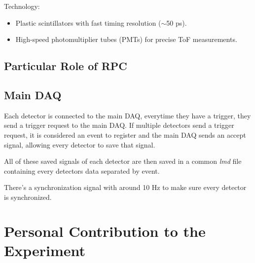 Technology:

\begin{itemize}
	\item Plastic scintillators with fast timing resolution ($\sim$50 ps).
	\item High-speed photomultiplier tubes (PMTs) for precise ToF measurements.
\end{itemize}



\subsection{Particular Role of RPC}

\cite{xarepe_resistive_2023}


\subsection{Main DAQ}

Each detector is connected to the main \gls{DAQ}, everytime they have a trigger, they send a trigger request to the main \gls{DAQ}. If multiple detectors send a trigger request, it is considered an event to register and the main \gls{DAQ} sends an accept signal, allowing every detector to save that signal.

All of these saved signals of each detector are then saved in a common \textit{lmd} file containing every detectors data separated by event.

There's a synchronization signal with around 10 Hz to make sure every detector is synchronized.


\section{Personal Contribution to the Experiment}